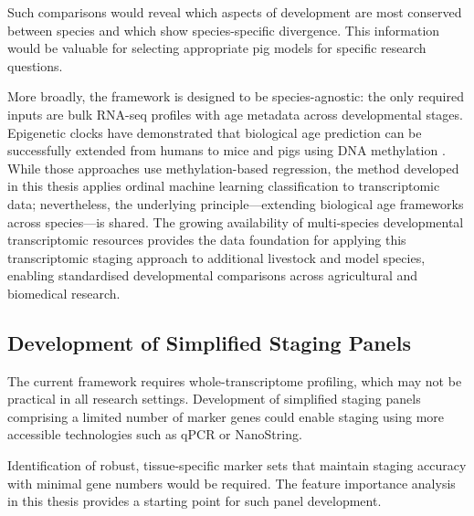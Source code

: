 Such comparisons would reveal which aspects of development are most conserved between species and which show species-specific divergence. This information would be valuable for selecting appropriate pig models for specific research questions.

More broadly, the framework is designed to be species-agnostic: the only required inputs are bulk RNA-seq profiles with age metadata across developmental stages. Epigenetic clocks have demonstrated that biological age prediction can be successfully extended from humans to mice and pigs using DNA methylation \parencite{horvath_dna_2013,bi_ageing_clock_team_multi-tissue_2017,schachtschneider_epigenetic_2021}. While those approaches use methylation-based regression, the method developed in this thesis applies ordinal machine learning classification to transcriptomic data; nevertheless, the underlying principle---extending biological age frameworks across species---is shared. The growing availability of multi-species developmental transcriptomic resources \parencite{cardoso-moreira_gene_2019,coorens_human_2025} provides the data foundation for applying this transcriptomic staging approach to additional livestock and model species, enabling standardised developmental comparisons across agricultural and biomedical research.

\subsection{Development of Simplified Staging Panels}

The current framework requires whole-transcriptome profiling, which may not be practical in all research settings. Development of simplified staging panels comprising a limited number of marker genes could enable staging using more accessible technologies such as qPCR or NanoString.

Identification of robust, tissue-specific marker sets that maintain staging accuracy with minimal gene numbers would be required. The feature importance analysis in this thesis provides a starting point for such panel development.
